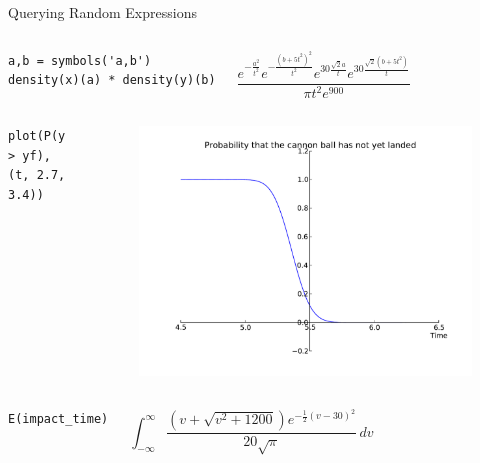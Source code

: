 \documentclass[compress, blue]{beamer}
\begin{document}
\begin{frame}{Querying Random Expressions}
    \begin{columns}

\begin{lstlisting}
a,b = symbols('a,b')
density(x)(a) * density(y)(b)
\end{lstlisting}

        $$
        \frac{e^{- \frac{a^{2}}{t^{2}}} e^{- \frac{\left(b + 5
            t^{2}\right)^{2}}{t^{2}}} e^{30 \frac{\sqrt{2} a}{t}} e^{30
        \frac{\sqrt{2} \left(b + 5 t^{2}\right)}{t}}}{\pi t^{2} e^{900}}
        $$

    \end{columns}
    \begin{columns}
\begin{lstlisting}
plot(P(y > yf), (t, 2.7, 3.4))
\end{lstlisting}
            \begin{figure}
                \includegraphics[width=\textwidth]{images/impact.pdf}
            \end{figure}
    \end{columns}
    
    \begin{columns}
\begin{lstlisting}
E(impact_time)
\end{lstlisting}
        $$\int_{-\infty}^{\infty} \frac{\left(v + \sqrt{v^{2} + 1200}\right)
        e^{- \frac{1}{2} \left(v -30\right)^{2}}}{20 \sqrt{\pi}}\, dv
        $$
    \end{columns}

\end{frame}
\end{document}
